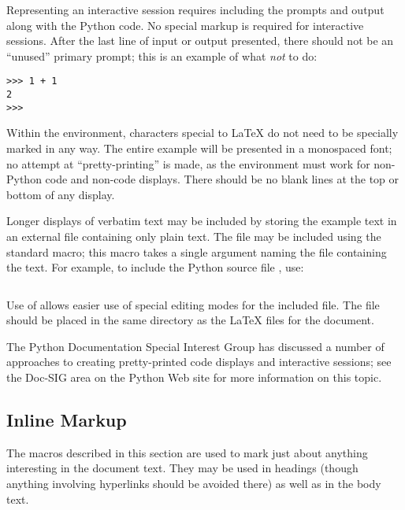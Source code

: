 \documentclass{howto}
\begin{document}
    Representing an interactive session requires including the prompts
    and output along with the Python code.  No special markup is
    required for interactive sessions.  After the last line of input
    or output presented, there should not be an ``unused'' primary
    prompt; this is an example of what \emph{not} to do:

\begin{verbatim}
>>> 1 + 1
2
>>>
\end{verbatim}

    Within the  environment, characters special to
    \LaTeX{} do not need to be specially marked in any way.  The entire
    example will be presented in a monospaced font; no attempt at
    ``pretty-printing'' is made, as the environment must work for
    non-Python code and non-code displays.  There should be no blank
    lines at the top or bottom of any  display.

    Longer displays of verbatim text may be included by storing the
    example text in an external file containing only plain text.  The
    file may be included using the standard 
    macro; this macro takes a single argument naming the file
    containing the text.  For example, to include the Python source
    file , use:

\begin{verbatim}

\end{verbatim}

    Use of  allows easier use of special editing
    modes for the included file.  The file should be placed in the
    same directory as the \LaTeX{} files for the document.

    The Python Documentation Special Interest Group has discussed a
    number of approaches to creating pretty-printed code displays and
    interactive sessions; see the Doc-SIG area on the Python Web site
    for more information on this topic.


  \subsection{Inline Markup \label{inline-markup}}

    The macros described in this section are used to mark just about
    anything interesting in the document text.  They may be used in
    headings (though anything involving hyperlinks should be avoided
    there) as well as in the body text.
\end{document}
